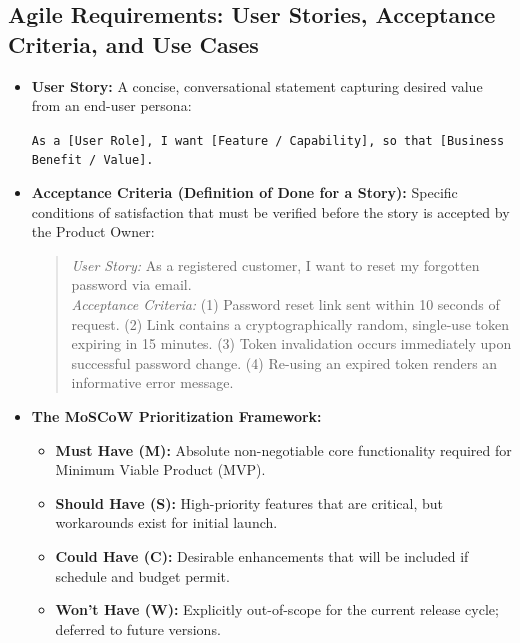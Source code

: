 \subsection{Agile Requirements: User Stories, Acceptance Criteria, and Use Cases}
\begin{itemize}
    \item \textbf{User Story:} A concise, conversational statement capturing desired value from an end-user persona:
    \begin{center}
    \texttt{As a [User Role], I want [Feature / Capability], so that [Business Benefit / Value].}
    \end{center}
    \item \textbf{Acceptance Criteria (Definition of Done for a Story):} Specific conditions of satisfaction that must be verified before the story is accepted by the Product Owner:
    \begin{quote}
    \textit{User Story:} As a registered customer, I want to reset my forgotten password via email. \\
    \textit{Acceptance Criteria:} (1) Password reset link sent within 10 seconds of request. (2) Link contains a cryptographically random, single-use token expiring in 15 minutes. (3) Token invalidation occurs immediately upon successful password change. (4) Re-using an expired token renders an informative error message.
    \end{quote}
    \item \textbf{The MoSCoW Prioritization Framework:}
    \begin{itemize}
        \item \textbf{Must Have (M):} Absolute non-negotiable core functionality required for Minimum Viable Product (MVP).
        \item \textbf{Should Have (S):} High-priority features that are critical, but workarounds exist for initial launch.
        \item \textbf{Could Have (C):} Desirable enhancements that will be included if schedule and budget permit.
        \item \textbf{Won't Have (W):} Explicitly out-of-scope for the current release cycle; deferred to future versions.
    \end{itemize}
\end{itemize}

